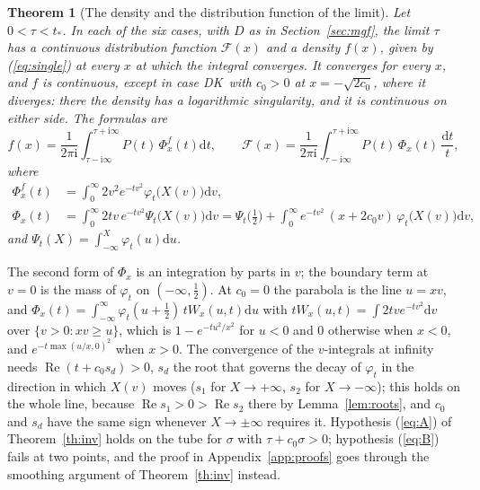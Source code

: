 \documentclass[ecta,nameyear,final]{econsocart}
\newcommand{\dr}[1]{{\mathrm d}#1}
\newcommand{\iu}{{\mathrm i}}
\newcommand{\Rea}{\operatorname{Re}}
\newcommand{\Fk}{\textsf{\upshape DK}}
\newcommand{\cF}{\mathcal{F}}
\theoremstyle{plain}
\newtheorem{theorem}{Theorem}
\theoremstyle{definition}
\begin{document}
\begin{theorem}[The density and the distribution function of the limit]
\label{th:single}
Let $0<\tau<t_*$.  In each of the six cases, with $D$ as in Section~\ref{sec:mgf}, the limit $\tau$ has a continuous distribution function $\cF(x)$ and a density $f(x)$, given by (\ref{eq:single}) at every $x$ at which the integral converges.  It converges for every $x$, and $f$ is continuous, except in case \Fk\ with $c_0>0$ at $x=-\sqrt{2c_0}$, where it diverges: there the density has a logarithmic singularity, and it is continuous on either side.  The formulas are
\begin{equation}
f(x)=\frac{1}{2\pi\iu}\int_{\tau-\iu\infty}^{\tau+\iu\infty}P(t)\,\Phi^f_x(t)\dr{t},\qquad
\cF(x)=\frac{1}{2\pi\iu}\int_{\tau-\iu\infty}^{\tau+\iu\infty}P(t)\,\Phi_x(t)\,\frac{\dr{t}}{t},
\label{eq:single}
\end{equation}
where
\begin{equation}
\begin{aligned}
\Phi^f_x(t)&=\int_0^\infty2v^2e^{-tv^2}\varphi_t\big(X(v)\big)\dr{v},\\
\Phi_x(t)&=\int_0^\infty2tv\,e^{-tv^2}\Psi_t\big(X(v)\big)\dr{v}
=\Psi_t\big(\tfrac12\big)+\int_0^\infty e^{-tv^2}\,(x+2c_0v)\,\varphi_t\big(X(v)\big)\dr{v},
\end{aligned}
\label{eq:Phidef}
\end{equation}
and $\Psi_t(X)=\int_{-\infty}^X\varphi_t(u)\dr{u}$.
\end{theorem}

The second form of $\Phi_x$ is an integration by parts in $v$; the boundary term at $v=0$ is the mass of $\varphi_t$ on $(-\infty,\frac12)$.  At $c_0=0$ the parabola is the line $u=xv$, and $\Phi_x(t)=\int_{-\infty}^{\infty}\varphi_t(u+\frac12)\,tW_x(u,t)\dr{u}$ with $tW_x(u,t)=\int2tve^{-tv^2}\dr{v}$ over $\{v>0:xv\ge u\}$, which is $1-e^{-tu^2/x^2}$ for $u<0$ and $0$ otherwise when $x<0$, and $e^{-t\max(u/x,0)^2}$ when $x>0$.  The convergence of the $v$-integrals at infinity needs $\Rea(t+c_0s_d)>0$, $s_d$ the root that governs the decay of $\varphi_t$ in the direction in which $X(v)$ moves ($s_1$ for $X\to+\infty$, $s_2$ for $X\to-\infty$); this holds on the whole line, because $\Rea s_1>0>\Rea s_2$ there by Lemma~\ref{lem:roots}, and $c_0$ and $s_d$ have the same sign whenever $X\to\pm\infty$ requires it.  Hypothesis (\ref{eq:A}) of Theorem~\ref{th:inv} holds on the tube for $\sigma$ with $\tau+c_0\sigma>0$; hypothesis (\ref{eq:B}) fails at two points, and the proof in Appendix~\ref{app:proofs} goes through the smoothing argument of Theorem~\ref{th:inv} instead.
\end{document}
